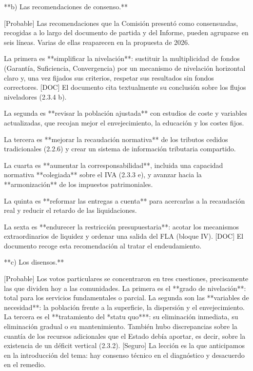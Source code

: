 \documentclass[10pt,a4paper]{article}
\begin{document}
**b) Las recomendaciones de consenso.**

[Probable] Las recomendaciones que la Comisión presentó como consensuadas, recogidas a lo largo del documento de partida y del Informe, pueden agruparse en seis líneas. Varias de ellas reaparecen en la propuesta de 2026.

La primera es **simplificar la nivelación**: sustituir la multiplicidad de fondos (Garantía, Suficiencia, Convergencia) por un mecanismo de nivelación horizontal claro y, una vez fijados sus criterios, respetar sus resultados sin fondos correctores. [DOC] El documento cita textualmente su conclusión sobre los flujos niveladores (2.3.4 b).

La segunda es **revisar la población ajustada** con estudios de coste y variables actualizadas, que recojan mejor el envejecimiento, la educación y los costes fijos.

La tercera es **mejorar la recaudación normativa** de los tributos cedidos tradicionales (2.2.6) y crear un sistema de información tributaria compartido.

La cuarta es **aumentar la corresponsabilidad**, incluida una capacidad normativa **colegiada** sobre el IVA (2.3.3 e), y avanzar hacia la **armonización** de los impuestos patrimoniales.

La quinta es **reformar las entregas a cuenta** para acercarlas a la recaudación real y reducir el retardo de las liquidaciones.

La sexta es **endurecer la restricción presupuestaria**: acotar los mecanismos extraordinarios de liquidez y ordenar una salida del FLA (bloque IV). [DOC] El documento recoge esta recomendación al tratar el endeudamiento.

**c) Los disensos.**

[Probable] Los votos particulares se concentraron en tres cuestiones, precisamente las que dividen hoy a las comunidades. La primera es el **grado de nivelación**: total para los servicios fundamentales o parcial. La segunda son las **variables de necesidad**: la población frente a la superficie, la dispersión y el envejecimiento. La tercera es el **tratamiento del *statu quo***: su eliminación inmediata, su eliminación gradual o su mantenimiento. También hubo discrepancias sobre la cuantía de los recursos adicionales que el Estado debía aportar, es decir, sobre la existencia de un déficit vertical (2.3.2). [Seguro] La lección es la que anticipamos en la introducción del tema: hay consenso técnico en el diagnóstico y desacuerdo en el remedio.
\end{document}
